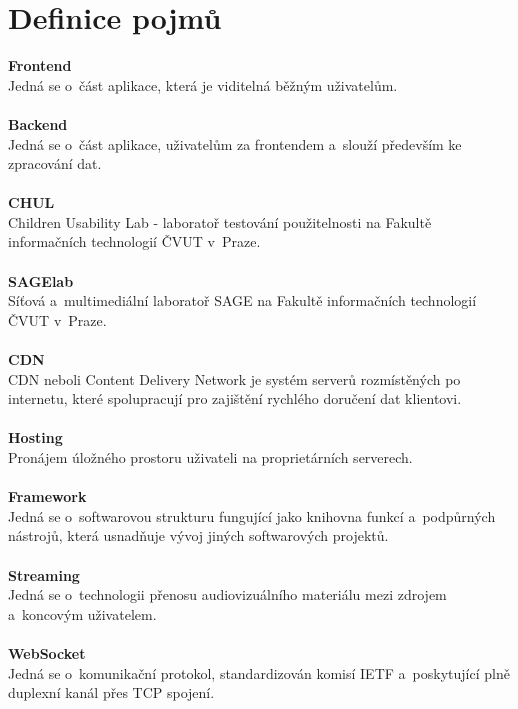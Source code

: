 \documentclass[thesis=M,czech]{FITthesis}[2012/06/26]
\begin{document}
\section{Definice pojmů} \label{sec:analyza_definice_pojmu}
\textbf{Frontend}\\
Jedná se o~část aplikace, která je viditelná běžným uživatelům.\\ \\
\textbf{Backend}\\
Jedná se o~část aplikace, uživatelům  za frontendem a~slouží především ke zpracování dat.\\ \\
\textbf{CHUL}\\
Children Usability Lab - laboratoř testování použitelnosti na Fakultě informačních technologií ČVUT v~Praze.\\ \\
\textbf{SAGElab}\\
Síťová a~multimediální laboratoř SAGE na Fakultě informačních technologií ČVUT v~Praze.\\ \\
\textbf{CDN}\\
CDN neboli Content Delivery Network je systém serverů rozmístěných po internetu, které spolupracují pro zajištění rychlého doručení dat klientovi.\\ \\
\textbf{Hosting}\\
Pronájem úložného prostoru uživateli na proprietárních serverech.\\ \\
\textbf{Framework}\\
Jedná se o~softwarovou strukturu fungující jako knihovna funkcí a~podpůrných nástrojů, která usnadňuje vývoj jiných softwarových projektů.\\ \\
\textbf{Streaming}\\
 Jedná se o~technologii přenosu audiovizuálního materiálu mezi zdrojem a~koncovým uživatelem.\\ \\
\textbf{WebSocket}\\
Jedná se o~komunikační protokol, standardizován komisí IETF a~poskytující plně duplexní kanál přes TCP spojení. \\ \\
\end{document}
